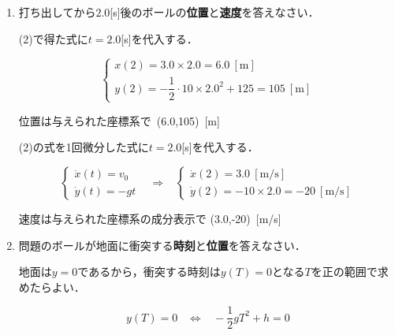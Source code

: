 \documentclass[a4paper,11pt]{ltjsarticle}
\begin{document}
\begin{enumerate}
\begin{enumerate}[label=(\arabic*)]
        \item 打ち出してから$2.0$[s]後のボールの\textbf{位置}と\textbf{速度}を答えなさい．

        \vspace{5pt}

        (2)で得た式に$t=2.0$[s]を代入する．

        \begin{equation*}
            \begin{cases}
                x(2)=3.0 \times 2.0=6.0\ [\mathrm{m}] \\
                y(2)=-\dfrac{1}{2} \cdot 10 \times 2.0^2+125=105\ [\mathrm{m}]
            \end{cases}
        \end{equation*}

        位置は与えられた座標系で\ (6.0,105)\ [m]

        \vspace{5pt}

        (2)の式を1回微分した式に$t=2.0$[s]を代入する．

        \begin{equation*}
            \begin{cases}
                \dot{x}(t)=v_0 \\
                \dot{y}(t)=-gt
            \end{cases}
            \hspace{10pt} \Rightarrow \hspace{10pt}
            \begin{cases}
                \dot{x}(2)=3.0\ [\mathrm{m/s}] \\
                \dot{y}(2)=-10 \times 2.0 = -20\ [\mathrm{m/s}]
            \end{cases}
        \end{equation*}

        速度は与えられた座標系の成分表示で (3.0,-20)\ [m/s]

        \vspace{5pt}

        \item 問題のボールが地面に衝突する\textbf{時刻}と\textbf{位置}を答えなさい．
        
        \vspace{5pt}

        地面は$y=0$であるから，衝突する時刻は$y(T)=0$となる$T$を正の範囲で求めたらよい．

        \begin{equation*}
            y(T)=0 \hspace{10pt} \Leftrightarrow \hspace{10pt}
            -\dfrac{1}{2}gT^2+h=0
        \end{equation*}


\end{enumerate}
\end{enumerate}
\end{document}
